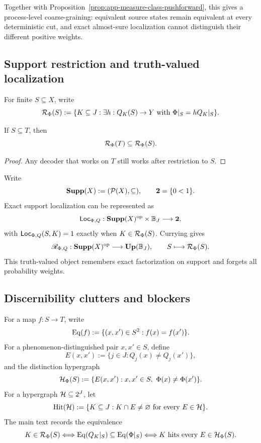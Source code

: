 Together with Proposition~\ref{prop:app-measure-class-pushforward}, this gives a process-level coarse-graining: equivalent source states remain equivalent at every deterministic cut, and exact almost-sure localization cannot distinguish their different positive weights.

\subsection{Support restriction and truth-valued localization}

For finite $S\subseteq X$, write
\[
\mathcal{R}_\Phi(S)
:=
\{K\subseteq J:\exists h:Q_K(S)\to Y\text{ with }\Phi|_S=hQ_K|_S\}.
\]

\begin{proposition}
\label{thm:app-support-restriction-shadow}
If $S\subseteq T$, then
\[
\mathcal{R}_\Phi(T)\subseteq\mathcal{R}_\Phi(S).
\]
\end{proposition}

\begin{proof}
Any decoder that works on $T$ still works after restriction to $S$.
\end{proof}

Write
\[
\mathbf{Supp}(X):=(\mathcal P(X),\subseteq),
\qquad
\mathbf{2}=\{0<1\}.
\]
Exact support localization can be represented as
\begin{equation}
\mathsf{Loc}_{\Phi,Q}:
\mathbf{Supp}(X)^{\mathrm{op}}\times\mathbb{B}_J
\longrightarrow\mathbf{2},
\label{eq:app-support-shadow-profunctor}
\end{equation}
with $\mathsf{Loc}_{\Phi,Q}(S,K)=1$ exactly when $K\in\mathcal{R}_\Phi(S)$. Currying gives
\begin{equation}
\mathscr R_{\Phi,Q}:
\mathbf{Supp}(X)^{\mathrm{op}}
\longrightarrow
\mathbf{Up}(\mathbb{B}_J),
\qquad
S\longmapsto\mathcal{R}_\Phi(S).
\label{eq:app-support-shadow-localization-functor}
\end{equation}
This truth-valued object remembers exact factorization on support and forgets all probability weights.

\subsection{Discernibility clutters and blockers}

For a map $f:S\to T$, write
\[
\operatorname{Eq}(f)
:=
\{(x,x')\in S^2:f(x)=f(x')\}.
\]
For a phenomenon-distinguished pair $x,x'\in S$, define
\[
E(x,x')
:=
\{j\in J:Q_j(x)\neq Q_j(x')\},
\]
and the distinction hypergraph
\[
\mathcal{H}_\Phi(S)
:=
\{E(x,x'):x,x'\in S,\ \Phi(x)\neq\Phi(x')\}.
\]
For a hypergraph $\mathcal{H}\subseteq2^J$, let
\[
\operatorname{Hit}(\mathcal{H})
:=
\{K\subseteq J:K\cap E\neq\varnothing\text{ for every }E\in\mathcal{H}\}.
\]
The main text records the equivalence
\[
K\in\mathcal{R}_\Phi(S)
\Longleftrightarrow
\operatorname{Eq}(Q_K|_S)\subseteq\operatorname{Eq}(\Phi|_S)
\Longleftrightarrow
K\text{ hits every }E\in\mathcal{H}_\Phi(S).
\]


